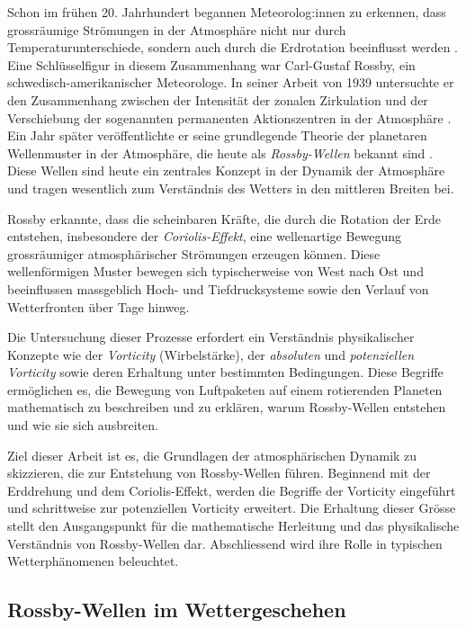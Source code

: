 

Schon im frühen 20. Jahrhundert begannen Meteorolog:innen zu erkennen, dass grossräumige Strömungen in der Atmosphäre nicht nur durch Temperaturunterschiede, sondern auch durch die Erdrotation beeinflusst werden \cite{rossby:https://doi.org/10.1002/wcc.95}.
Eine Schlüsselfigur in diesem Zusammenhang war Carl-Gustaf Rossby, ein schwedisch-amerikanischer Meteorologe.
In seiner Arbeit von 1939 untersuchte er den Zusammenhang zwischen der Intensität der zonalen Zirkulation und der Verschiebung der sogenannten permanenten Aktionszentren in der Atmosphäre \cite{rossby:1939relation}.
Ein Jahr später veröffentlichte er seine grundlegende Theorie der planetaren Wellenmuster in der Atmosphäre, die heute als \emph{Rossby-Wellen} bekannt sind \cite{rossby:1940planetary}.
Diese Wellen sind heute ein zentrales Konzept in der Dynamik der Atmosphäre und tragen wesentlich zum Verständnis des Wetters in den mittleren Breiten bei.

Rossby erkannte, dass die scheinbaren Kräfte, die durch die Rotation der Erde entstehen, insbesondere der \emph{Coriolis-Effekt}, eine wellenartige Bewegung grossräumiger atmosphärischer Strömungen erzeugen können.
Diese wellenförmigen Muster bewegen sich typischerweise von West nach Ost und beeinflussen massgeblich Hoch- und Tiefdrucksysteme sowie den Verlauf von Wetterfronten über Tage hinweg.

Die Untersuchung dieser Prozesse erfordert ein Verständnis physikalischer Konzepte wie der \emph{Vorticity} (Wirbelstärke), der \emph{absoluten} und \emph{potenziellen Vorticity} sowie deren Erhaltung unter bestimmten Bedingungen.
Diese Begriffe ermöglichen es, die Bewegung von Luftpaketen auf einem rotierenden Planeten mathematisch zu beschreiben und zu erklären, warum Rossby-Wellen entstehen und wie sie sich ausbreiten.

Ziel dieser Arbeit ist es, die Grundlagen der atmosphärischen Dynamik zu skizzieren, die zur Entstehung von Rossby-Wellen führen.
Beginnend mit der Erddrehung und dem Coriolis-Effekt, werden die Begriffe der Vorticity eingeführt und schrittweise zur potenziellen Vorticity erweitert.
Die Erhaltung dieser Grösse stellt den Ausgangspunkt für die mathematische Herleitung und das physikalische Verständnis von Rossby-Wellen dar.
Abschliessend wird ihre Rolle in typischen Wetterphänomenen beleuchtet.


\subsection{Rossby-Wellen im Wettergeschehen}

